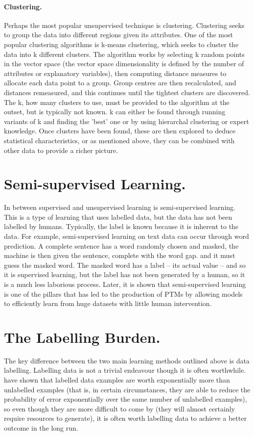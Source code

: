 \paragraph{Clustering.} Perhaps the most popular unsupervised technique is clustering. Clustering seeks to group the data into different regions given its attributes. One of the most popular clustering algorithms is k-means clustering, which seeks to cluster the data into k different clusters. The algorithm works by selecting k random points in the vector space (the vector space dimensionality is defined by the number of attributes or explanatory variables), then computing distance measures to allocate each data point to a group. Group centres are then recalculated, and distances remeasured, and this continues until the tightest clusters are discovered. The k, how many clusters to use, must be provided to the algorithm at the outset, but is typically not known. k can either be found through running variants of k and finding the ’best’ one or by using hierarchal clustering or expert knowledge. Once clusters have been found, these are then explored to deduce statistical characteristics, or as mentioned above, they can be combined with other data to provide a richer picture.


\section{Semi-supervised Learning.} In between supervised and unsupervised learning is semi-supervised learning. This is a type of learning that uses labelled data, but the data has not been labelled by humans. Typically, the label is known because it is inherent to the data. For example, semi-supervised learning on text data can occur through word prediction. A complete sentence has a word randomly chosen and masked, the machine is then given the sentence, complete with the word gap. and it must guess the masked word. The masked word has a label  –  its actual value  –  and so it is supervised learning, but the label has not been generated by a human, so it is a much less laborious process. Later, it is shown that semi-supervised learning is one of the pillars that has led to the production of PTMs by allowing models to efficiently learn from huge datasets with little human intervention.


\section{The Labelling Burden.} The key difference between the two main learning methods outlined above is data labelling. Labelling data is not a trivial endeavour though it is often worthwhile. \textcite{castelli1995exponential}  have shown that labelled data examples are worth exponentially more than unlabelled examples (that is, in certain circumstances, they are able to reduce the probability of error exponentially over the same number of unlabelled examples), so even though they are more difficult to come by (they will almost certainly require resources to generate), it is often worth labelling data to achieve a better outcome in the long run. 

